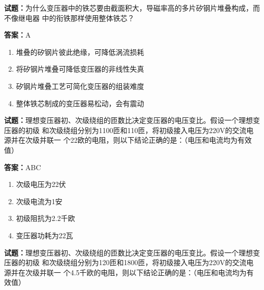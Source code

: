 \documentclass{ctexbook}
\begin{document}




\vspace{1em}

\textbf{试题：}为什么变压器中的铁芯要由截面积大，导磁率高的多片矽钢片堆叠构成，而不像继电器
中的衔铁那样使用整体铁芯？ 

\textbf{答案：}A 

\begin{enumerate}[leftmargin=3em]
  \item 堆叠的矽钢片彼此绝缘，可降低涡流损耗 

  \item 将矽钢片堆叠可降低变压器的非线性失真 

  \item 矽钢片堆叠工艺可简化变压器的组装难度 

  \item 整体铁芯制成的变压器易松动，会有震动 

\end{enumerate}





\vspace{1em}

\textbf{试题：}理想变压器初、次级绕组的匝数比决定变压器的电压变比。假设一个理想变压器的初级
和次级绕组分别为1100匝和110匝，将初级接入电压为220V的交流电源并在次级并联一
个22欧的电阻，则以下结论正确的是：（电压和电流均为有效值） 

\textbf{答案：}ABC 

\begin{enumerate}[leftmargin=3em]
  \item 次级电压为22伏 

  \item 次级电流为1安 


  \item 初级阻抗为2.2千欧 

  \item 变压器功耗为22瓦 

\end{enumerate}





\vspace{1em}

\textbf{试题：}理想变压器初、次级绕组的匝数比决定变压器的电压变比。假设一个理想变压器的初级
和次级绕组分别为120匝和1800匝，将初级接入电压为220V的交流电源并在次级并联一
个4.5千欧的电阻，则以下结论正确的是：（电压和电流均为有效值） 
\end{document}
